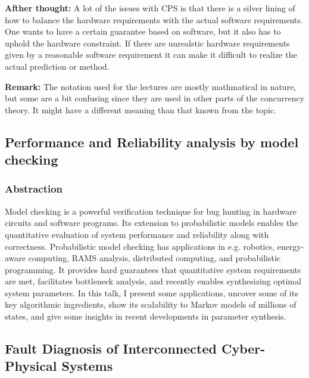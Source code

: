 \documentclass[9pt, english, a4paper]{article}
\theoremstyle{definition}
\begin{document}
	\noindent \textbf{Afther thought:} A lot of the issues with CPS is that there is a silver lining of how to balance the hardware requirements with the actual software requirements. One wants to have a certain guarantee based on software, but it also has to uphold the hardware constraint. If there are unrealstic hardware requirements given by a reasonable software requirement it can make it difficult to realize the actual prediction or method.

	\noindent \textbf{Remark:} The notation used for the lectures are mostly mathmatical in nature, but some are a bit confusing since they are used in other parts of the concurrency theory. It might have a different meaning than that known from the topic.

\subsection{Performance and Reliability analysis by model checking}
	\subsubsection{Abstraction}
		Model checking is a powerful verification technique for bug hunting in hardware circuits and software programs. Its extension to probabilistic models enables the quantitative evaluation of system performance and reliability along with correctness. Probabilistic model checking has applications in e.g. robotics, energy-aware computing, RAMS analysis, distributed computing, and probabilistic programming. It provides hard guarantees that quantitative system requirements are met, facilitates bottleneck analysis, and recently enables synthesizing optimal system parameters. In this talk, I present some applications, uncover some of its key algorithmic ingredients, show its scalability to Markov models of millions of states, and give some insights in recent developments in parameter synthesis.


\subsection{Fault Diagnosis of Interconnected Cyber-Physical Systems}
\end{document}
